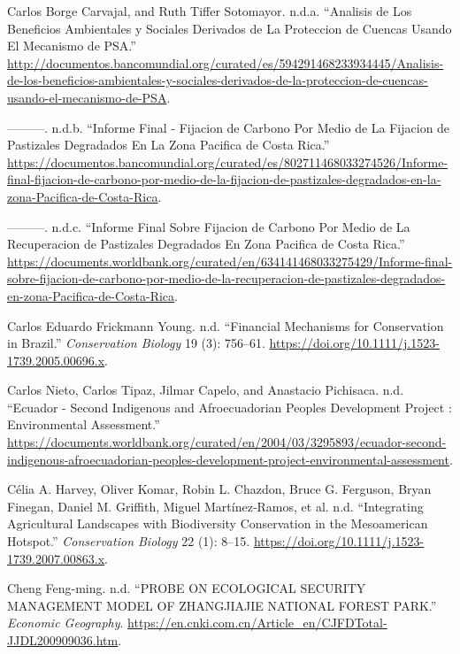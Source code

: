 \begin{CSLReferences}{1}{0}
Carlos Borge Carvajal, and Ruth Tiffer Sotomayor. n.d.a. {``Analisis de
Los Beneficios Ambientales y Sociales Derivados de La Proteccion de
Cuencas Usando El Mecanismo de PSA.''}
\url{http://documentos.bancomundial.org/curated/es/594291468233934445/Analisis-de-los-beneficios-ambientales-y-sociales-derivados-de-la-proteccion-de-cuencas-usando-el-mecanismo-de-PSA}.

---------. n.d.b. {``Informe Final - Fijacion de Carbono Por Medio de La
Fijacion de Pastizales Degradados En La Zona Pacifica de Costa Rica.''}
\url{https://documentos.bancomundial.org/curated/es/802711468033274526/Informe-final-fijacion-de-carbono-por-medio-de-la-fijacion-de-pastizales-degradados-en-la-zona-Pacifica-de-Costa-Rica}.

---------. n.d.c. {``Informe Final Sobre Fijacion de Carbono Por Medio
de La Recuperacion de Pastizales Degradados En Zona Pacifica de Costa
Rica.''}
\url{https://documents.worldbank.org/curated/en/634141468033275429/Informe-final-sobre-fijacion-de-carbono-por-medio-de-la-recuperacion-de-pastizales-degradados-en-zona-Pacifica-de-Costa-Rica}.

Carlos Eduardo Frickmann Young. n.d. {``Financial Mechanisms for
Conservation in Brazil.''} \emph{Conservation Biology} 19 (3): 756--61.
\url{https://doi.org/10.1111/j.1523-1739.2005.00696.x}.

Carlos Nieto, Carlos Tipaz, Jilmar Capelo, and Anastacio Pichisaca. n.d.
{``Ecuador - Second Indigenous and Afroecuadorian Peoples Development
Project : Environmental Assessment.''}
\url{https://documents.worldbank.org/curated/en/2004/03/3295893/ecuador-second-indigenous-afroecuadorian-peoples-development-project-environmental-assessment}.

Célia A. Harvey, Oliver Komar, Robin L. Chazdon, Bruce G. Ferguson,
Bryan Finegan, Daniel M. Griffith, Miguel Martínez‐Ramos, et al. n.d.
{``Integrating Agricultural Landscapes with Biodiversity Conservation in
the Mesoamerican Hotspot.''} \emph{Conservation Biology} 22 (1): 8--15.
\url{https://doi.org/10.1111/j.1523-1739.2007.00863.x}.

Cheng Feng-ming. n.d. {``PROBE ON ECOLOGICAL SECURITY MANAGEMENT MODEL
OF ZHANGJIAJIE NATIONAL FOREST PARK.''} \emph{Economic Geography}.
\url{https://en.cnki.com.cn/Article_en/CJFDTotal-JJDL200909036.htm}.


\end{CSLReferences}
